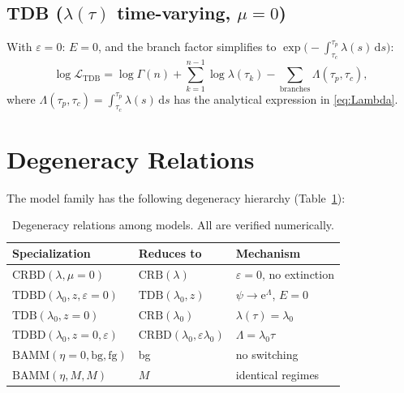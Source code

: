\documentclass[11pt,a4paper]{article}
\newcommand{\dd}{\mathrm{d}}
\newcommand{\ee}{\mathrm{e}}
\newcommand{\eps}{\varepsilon}
\newcommand{\Lam}{\Lambda}
\theoremstyle{plain}
\theoremstyle{definition}
\theoremstyle{remark}
\begin{document}
\subsection{TDB ($\lambda(\tau)$ time-varying, $\mu = 0$)}

With $\eps = 0$: $E = 0$, and the branch factor simplifies to $\exp\!\bigl(-\!\int_{\tau_c}^{\tau_p}\!\lambda(s)\,\dd s\bigr)$:
\begin{equation}\label{eq:tdb}
  \log\mathcal{L}_{\text{TDB}}
  = \log\Gamma(n) + \sum_{k=1}^{n-1}\log\lambda(\tau_k) - \sum_{\text{branches}} \Lam(\tau_p, \tau_c),
\end{equation}
where $\Lam(\tau_p, \tau_c) = \int_{\tau_c}^{\tau_p} \lambda(s)\,\dd s$ has the analytical expression in \eqref{eq:Lambda}.

\section{Degeneracy Relations}
\label{sec:degeneracy}

The model family has the following degeneracy hierarchy (Table~\ref{tab:degeneracy}):

\begin{table}[h]
\centering
\begin{tabular}{@{}lll@{}}
\toprule
\textbf{Specialization} & \textbf{Reduces to} & \textbf{Mechanism} \\
\midrule
$\text{CRBD}(\lambda, \mu\!=\!0)$ & $\text{CRB}(\lambda)$ & $\eps = 0$, no extinction \\
$\text{TDBD}(\lambda_0, z, \eps\!=\!0)$ & $\text{TDB}(\lambda_0, z)$ & $\psi \to \ee^{\Lam}$, $E = 0$ \\
$\text{TDB}(\lambda_0, z\!=\!0)$ & $\text{CRB}(\lambda_0)$ & $\lambda(\tau) = \lambda_0$ \\
$\text{TDBD}(\lambda_0, z\!=\!0, \eps)$ & $\text{CRBD}(\lambda_0, \eps\lambda_0)$ & $\Lam = \lambda_0\tau$ \\
$\text{BAMM}(\eta\!=\!0, \text{bg}, \text{fg})$ & bg & no switching \\
$\text{BAMM}(\eta, M, M)$ & $M$ & identical regimes \\
\bottomrule
\end{tabular}
\caption{Degeneracy relations among models. All are verified numerically.}
\label{tab:degeneracy}
\end{table}
\end{document}
